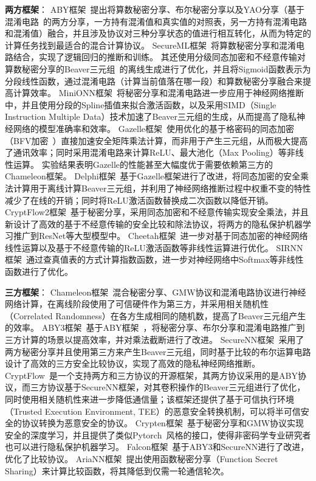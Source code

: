 \textbf{两方框架}：
ABY框架~\cite{demmler2015aby}提出将算数秘密分享、布尔秘密分享以及YAO分享（基于混淆电路~\cite{yao1986gc}的两方分享，一方持有混淆值和真实值的对照表，另一方持有混淆电路和混淆值）融合，并且涉及协议对三种分享状态的值进行相互转化，从而为特定的计算任务找到最适合的混合计算协议。
%
SecureML框架~\cite{mohassel2017secureml}将算数秘密分享和混淆电路结合，实现了逻辑回归的推断和训练。
%
其还使用分级同态加密和不经意传输对算数秘密分享的Beaver三元组~\cite{beaver1992efficient}的离线生成进行了优化，并且将Sigmoid函数表示为分段线性函数，通过混淆电路（计算当前值落在哪一段）和算数秘密分享融合来提高计算效率。
%
MiniONN框架~\cite{liujian2017minionn}将秘密分享和混淆电路进一步应用于神经网络推断中，并且使用分段的Spline插值来拟合激活函数，以及采用SIMD（Single Instruction Multiple Data）技术加速了Beaver三元组的生成，从而提高了隐私神经网络的模型准确率和效率。
%
Gazelle框架~\cite{juvekar2018gazelle}使用优化的基于格密码的同态加密（BFV加密~\cite{2012bfv1,2012bfv2}）直接加速安全矩阵乘法计算，而非用于产生三元组，从而极大提高了通讯效率；同时采用混淆电路来计算ReLU、最大池化（Max Pooling）等非线性运算。
实验结果表明Gazelle的性能甚至大幅度优于需要依赖第三方的Chameleon框架。
%
Delphi框架~\cite{mishra2020delphi}基于Gazelle框架进行了改进，将同态加密的安全乘法计算用于离线计算Beaver三元组，并利用了神经网络推断过程中权重不变的特性减少了在线的开销；同时将ReLU激活函数替换成二次函数以降低开销。
%
CryptFlow2框架~\cite{rathee2020cryptflow2}基于秘密分享，采用同态加密和不经意传输实现安全乘法，并且新设计了高效的基于不经意传输的安全比较和除法协议，将两方的隐私保护机器学习推广到ResNet等大型模型中。
%
Cheetah框架~\cite{huang2022cheetah}进一步对基于同态加密的神经网络线性运算以及基于不经意传输的ReLU激活函数等非线性运算进行优化。
SIRNN框架~\cite{rathee2021sirnn}通过查真值表的方式计算指数函数，进一步对神经网络中Softmax等非线性函数进行了优化。

\textbf{三方框架}：
Chameleon框架~\cite{riazi_2018_chameleon}混合秘密分享、GMW协议和混淆电路协议进行神经网络计算，在离线阶段使用了可信硬件作为第三方，并采用相关随机性（Correlated Randomness）在各方生成相同的随机数，提高了Beaver三元组产生的效率。
%
ABY3框架~\cite{mohassel2018aby3}基于ABY框架~\cite{demmler2015aby}，将秘密分享、布尔分享和混淆电路推广到三方计算的场景以提高效率，并对乘法截断进行了改进。
%
SecureNN框架~\cite{wagh2019securenn}采用了两方秘密分享并且使用第三方来产生Beaver三元组，同时基于比较的布尔运算电路设计了高效的三方安全比较协议，实现了高效的隐私神经网络推断。
%
CryptFlow~\cite{kumar2020cryptflow}是一个支持两方和三方协议的开源框架，其两方协议采用的是ABY协议，而三方协议基于SecureNN框架，对其卷积操作的Beaver三元组进行了优化，同时使用相关随机性来进一步降低通信量；该框架还提供了基于可信执行环境（Trusted Execution Environment, TEE）的恶意安全转换机制，可以将半可信安全的协议转换为恶意安全的协议。
%
Crypten框架~\cite{knott2021crypten}基于秘密分享和GMW协议实现安全的深度学习，并且提供了类似Pytorch~\cite{2019_pytorch}风格的接口，使得非密码学专业研究者也可以进行隐私保护机器学习。
%
Falcon框架~\cite{wagh2021falcon}基于ABY3和SecureNN进行了改进，优化了比较协议。
%
AriaNN框架~\cite{ryffel2021ariann}提出使用函数秘密分享（Function Secret Sharing）来计算比较函数，将其降低到仅需一轮通信轮次。


